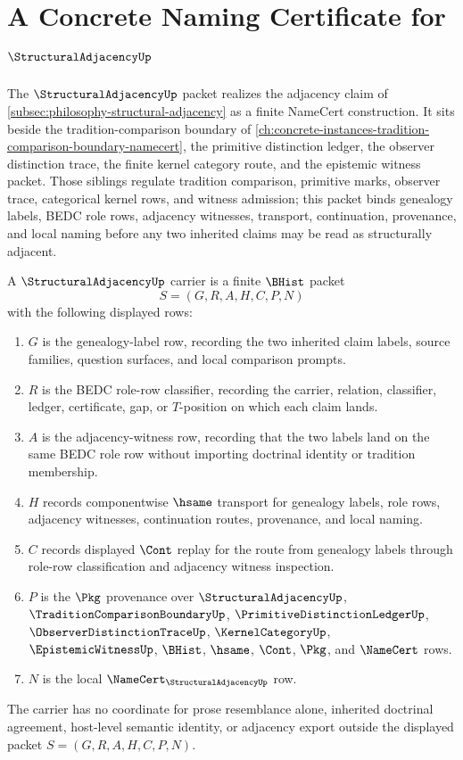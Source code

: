 \chapter{A Concrete Naming Certificate for $\StructuralAdjacencyUp$}
\label{ch:concrete-instances-structuraladjacency-namecert}

The $\StructuralAdjacencyUp$ packet realizes the adjacency claim of \autoref{subsec:philosophy-structural-adjacency} as a finite NameCert construction. It sits beside the tradition-comparison boundary of \autoref{ch:concrete-instances-tradition-comparison-boundary-namecert}, the primitive distinction ledger, the observer distinction trace, the finite kernel category route, and the epistemic witness packet. Those siblings regulate tradition comparison, primitive marks, observer trace, categorical kernel rows, and witness admission; this packet binds genealogy labels, BEDC role rows, adjacency witnesses, transport, continuation, provenance, and local naming before any two inherited claims may be read as structurally adjacent.

\begin{definition}
\label{def:structural-adjacency-carrier}
A $\StructuralAdjacencyUp$ carrier is a finite $\BHist$ packet
$$
S=(G,R,A,H,C,P,N)
$$
with the following displayed rows:
\begin{enumerate}
\item $G$ is the genealogy-label row, recording the two inherited claim labels, source families, question surfaces, and local comparison prompts.
\item $R$ is the BEDC role-row classifier, recording the carrier, relation, classifier, ledger, certificate, gap, or $T$-position on which each claim lands.
\item $A$ is the adjacency-witness row, recording that the two labels land on the same BEDC role row without importing doctrinal identity or tradition membership.
\item $H$ records componentwise $\hsame$ transport for genealogy labels, role rows, adjacency witnesses, continuation routes, provenance, and local naming.
\item $C$ records displayed $\Cont$ replay for the route from genealogy labels through role-row classification and adjacency witness inspection.
\item $P$ is the $\Pkg$ provenance over $\StructuralAdjacencyUp$, $\TraditionComparisonBoundaryUp$, $\PrimitiveDistinctionLedgerUp$, $\ObserverDistinctionTraceUp$, $\KernelCategoryUp$, $\EpistemicWitnessUp$, $\BHist$, $\hsame$, $\Cont$, $\Pkg$, and $\NameCert$ rows.
\item $N$ is the local $\NameCert_{\StructuralAdjacencyUp}$ row.
\end{enumerate}
The carrier has no coordinate for prose resemblance alone, inherited doctrinal agreement, host-level semantic identity, or adjacency export outside the displayed packet $S=(G,R,A,H,C,P,N)$.
\end{definition}

